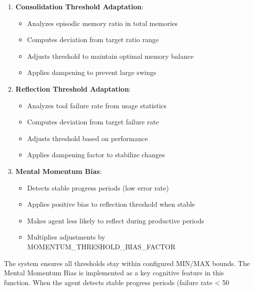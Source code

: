\documentclass[12pt,a4paper]{article}
\begin{document}
\begin{enumerate}[label=\arabic*.]
    \item \textbf{Consolidation Threshold Adaptation}:
    \begin{itemize}
        \item Analyzes episodic memory ratio in total memories
        \item Computes deviation from target ratio range
        \item Adjusts threshold to maintain optimal memory balance
        \item Applies dampening to prevent large swings
    \end{itemize}
    \item \textbf{Reflection Threshold Adaptation}:
    \begin{itemize}
        \item Analyzes tool failure rate from usage statistics
        \item Computes deviation from target failure rate
        \item Adjusts threshold based on performance
        \item Applies dampening factor to stabilize changes
    \end{itemize}
    \item \textbf{Mental Momentum Bias}:
    \begin{itemize}
        \item Detects stable progress periods (low error rate)
        \item Applies positive bias to reflection threshold when stable
        \item Makes agent less likely to reflect during productive periods
        \item Multiplies adjustments by MOMENTUM\_THRESHOLD\_BIAS\_FACTOR
    \end{itemize}
\end{enumerate}

The system ensures all thresholds stay within configured MIN/MAX bounds. The Mental Momentum Bias is implemented as a key cognitive feature in this function. When the agent detects stable progress periods (failure rate < 50%
\end{document}
